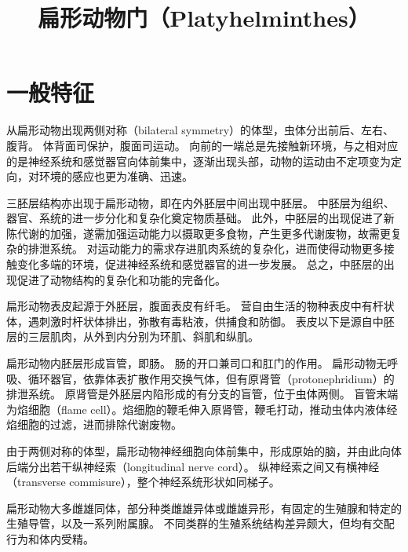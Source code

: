 \documentclass[11pt]{article}
\title{扁形动物门（Platyhelminthes）}
\date{}
\begin{document}
  \maketitle

  \linenumbers
\section{一般特征}
从扁形动物出现两侧对称（bilateral symmetry）的体型，虫体分出前后、左右、腹背。
体背面司保护，腹面司运动。
向前的一端总是先接触新环境，与之相对应的是神经系统和感觉器官向体前集中，逐渐出现头部，动物的运动由不定项变为定向，对环境的感应也更为准确、迅速。

\newline

三胚层结构亦出现于扁形动物，即在内外胚层中间出现中胚层。
中胚层为组织、器官、系统的进一步分化和复杂化奠定物质基础。
此外，中胚层的出现促进了新陈代谢的加强，遂需加强运动能力以摄取更多食物，产生更多代谢废物，故需更复杂的排泄系统。
对运动能力的需求存进肌肉系统的复杂化，进而使得动物更多接触变化多端的环境，促进神经系统和感觉器官的进一步发展。
总之，中胚层的出现促进了动物结构的复杂化和功能的完备化。

\newline

扁形动物表皮起源于外胚层，腹面表皮有纤毛。
营自由生活的物种表皮中有杆状体，遇刺激时杆状体排出，弥散有毒粘液，供捕食和防御。
表皮以下是源自中胚层的三层肌肉，从外到内分别为环肌、斜肌和纵肌。

\newline

扁形动物内胚层形成盲管，即肠。
肠的开口兼司口和肛门的作用。
扁形动物无呼吸、循环器官，依靠体表扩散作用交换气体，但有原肾管（protonephridium）的排泄系统。
原肾管是外胚层内陷形成的有分支的盲管，位于虫体两侧。
盲管末端为焰细胞（flame cell）。焰细胞的鞭毛伸入原肾管，鞭毛打动，推动虫体内液体经焰细胞的过滤，进而排除代谢废物。

\newline

由于两侧对称的体型，扁形动物神经细胞向体前集中，形成原始的脑，并由此向体后端分出若干纵神经索（longitudinal nerve cord）。
纵神经索之间又有横神经（transverse commisure），整个神经系统形状如同梯子。

\newline

扁形动物大多雌雄同体，部分种类雌雄异体或雌雄异形，有固定的生殖腺和特定的生殖导管，以及一系列附属腺。
不同类群的生殖系统结构差异颇大，但均有交配行为和体内受精。
\end{document}
